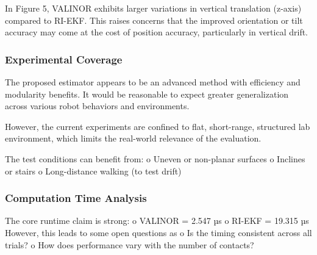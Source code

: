 \begin{revquote}
In Figure 5, VALINOR exhibits larger variations in vertical translation (z-axis) compared to RI-EKF. This raises concerns that the improved orientation or tilt accuracy may come at the cost of position accuracy, particularly in vertical drift.
\end{revquote}

\subsubsection{Experimental Coverage}

\begin{revquote}
The proposed estimator appears to be an advanced method with efficiency and modularity benefits. It would be reasonable to expect greater generalization across various robot behaviors and environments.
\end{revquote}

\begin{revquote}
However, the current experiments are confined to flat, short-range, structured lab environment, which limits the real-world relevance of the evaluation.
\end{revquote}

\begin{revquote}
The test conditions can benefit from:
      o Uneven or non-planar surfaces
      o Inclines or stairs
      o Long-distance walking (to test drift)
\end{revquote}

\subsubsection{Computation Time Analysis}

\begin{revquote}
The core runtime claim is strong:
      o VALINOR = 2.547 µs
      o RI-EKF = 19.315 µs
However, this leads to some open questions as
      o Is the timing consistent across all trials?
      o How does performance vary with the number of contacts?
    
\end{revquote}